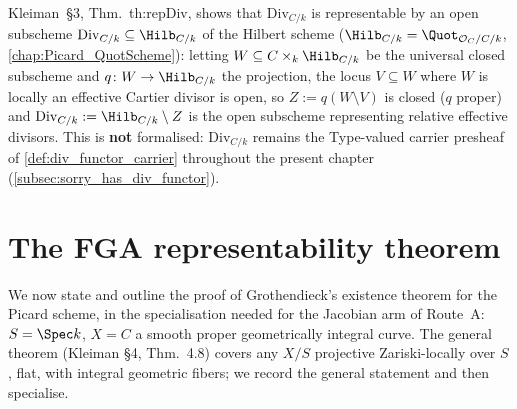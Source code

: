 \begin{remark}
  \label{rem:div_functor_representability}
  Kleiman~\S 3, Thm.~th:repDiv, shows that \(\mathrm{Div}_{C/k}\) is
  representable by an open subscheme \(\mathrm{Div}_{C/k} \subseteq
  \Hilb_{C/k}\) of the Hilbert scheme (\(\Hilb_{C/k} =
  \Quot_{\mathcal{O}_C/C/k}\), \cref{chap:Picard_QuotScheme}): letting
  \(W \subseteq C \times_k \Hilb_{C/k}\) be the universal closed
  subscheme and \(q \colon W \to \Hilb_{C/k}\) the projection, the locus
  \(V \subseteq W\) where \(W\) is locally an effective Cartier divisor
  is open, so \(Z := q(W \setminus V)\) is closed (\(q\) proper) and
  \(\mathrm{Div}_{C/k} := \Hilb_{C/k} \setminus Z\) is the open
  subscheme representing relative effective divisors. This is
  \textbf{not} formalised: \(\mathrm{Div}_{C/k}\) remains the
  Type-valued carrier presheaf of \cref{def:div_functor_carrier}
  throughout the present chapter (\cref{subsec:sorry_has_div_functor}).
\end{remark}

\section{The FGA representability theorem}
\label{sec:fga_pic_representability}

We now state and outline the proof of Grothendieck's existence theorem
for the Picard scheme, in the specialisation needed for the Jacobian arm
of Route~A: \(S = \Spec k\), \(X = C\) a smooth proper geometrically integral
curve. The general theorem (Kleiman \S 4, Thm.~4.8) covers any
\(X/S\) projective Zariski-locally over \(S\), flat, with integral geometric
fibers; we record the general statement and then specialise.

